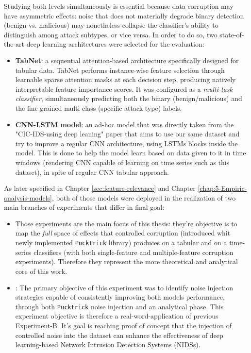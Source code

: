 \documentclass[../main.tex]{subfiles}
\begin{document}
Studying both levels simultaneously is essential because data corruption may have asymmetric effects: noise that does not materially degrade binary detection (benign vs. malicious) may nonetheless collapse the classifier's ability to distinguish among attack subtypes, or vice versa. In order to do so, two state-of-the-art deep learning architectures were selected for the evaluation:

\begin{itemize}
    \item \textbf{TabNet}: a sequential attention-based architecture specifically designed for tabular data. TabNet performs instance-wise feature selection through learnable sparse attention masks at each decision step, producing natively interpretable feature importance scores.  It was configured as a \emph{multi-task classifier}, simultaneously predicting both the binary (benign/malicious) and the fine-grained multi-class (specific attack type) labels.
    
    \item \textbf{CNN-LSTM model}: an ad-hoc model that was directly taken from the "CIC-IDS-using deep leaning"\supercite{jablaoui2024effective} paper that aims to use our same dataset and try to improve a regular CNN architecture, using LSTMs blocks inside the model. This is done to help the model learn based on data given to it in time windows (rendering CNN capable of learning on time series such as this dataset), in spite of regular CNN tabular approach. 
\end{itemize}

As later specified in Chapter \ref{sec:feature-relevance} and Chapter \ref{chap:5-Empiric-analysis-models}, both of those models were deployed in the realization of two main branches of experiments that differ in final goal:
\begin{itemize}
    
    \item {} Those experiments are the main focus of this thesis: they're objective is to map the \emph{full} space of effects that controlled corruption (introduced whit newly implemented \texttt{Pucktrick} library) produces on a tabular and on a time-series classifiers (with both single-feature and multiple-feature corruption experiments). Therefore they represent the more theoretical and analytical core of this work. 

    \item {}: The primary objective of this experiment was to identify noise injection strategies capable of consistently improving both models performance, through both \texttt{Pucktrick} noise injection and an analytical phase. This experiment objective is therefore a real-word-application of previous Experiment-B. It's goal is reaching proof of concept that the injection of controlled noise into the dataset can enhance the effectiveness of deep learning-based Network Intrusion Detection Systems (NIDSs).
    
\end{itemize}
\end{document}
